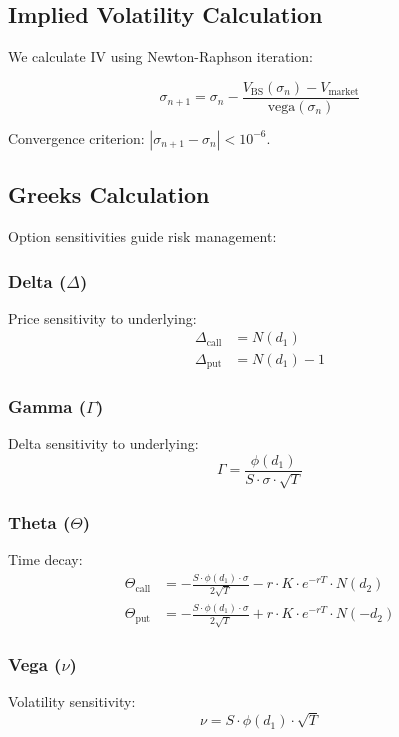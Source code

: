 \documentclass[11pt,a4paper]{article}
\begin{document}
\subsection{Implied Volatility Calculation}

We calculate IV using Newton-Raphson iteration:

\begin{equation}
\sigma_{n+1} = \sigma_n - \frac{V_{\text{BS}}(\sigma_n) - V_{\text{market}}}{\text{vega}(\sigma_n)}
\end{equation}

Convergence criterion: $|\sigma_{n+1} - \sigma_n| < 10^{-6}$.

\subsection{Greeks Calculation}

Option sensitivities guide risk management:

\subsubsection{Delta ($\Delta$)}
Price sensitivity to underlying:
\begin{align}
\Delta_{\text{call}} &= N(d_1) \\
\Delta_{\text{put}} &= N(d_1) - 1
\end{align}

\subsubsection{Gamma ($\Gamma$)}
Delta sensitivity to underlying:
\begin{equation}
\Gamma = \frac{\phi(d_1)}{S \cdot \sigma \cdot \sqrt{T}}
\end{equation}

\subsubsection{Theta ($\Theta$)}
Time decay:
\begin{align}
\Theta_{\text{call}} &= -\frac{S \cdot \phi(d_1) \cdot \sigma}{2\sqrt{T}} - r \cdot K \cdot e^{-rT} \cdot N(d_2) \\
\Theta_{\text{put}} &= -\frac{S \cdot \phi(d_1) \cdot \sigma}{2\sqrt{T}} + r \cdot K \cdot e^{-rT} \cdot N(-d_2)
\end{align}

\subsubsection{Vega ($\nu$)}
Volatility sensitivity:
\begin{equation}
\nu = S \cdot \phi(d_1) \cdot \sqrt{T}
\end{equation}
\end{document}
